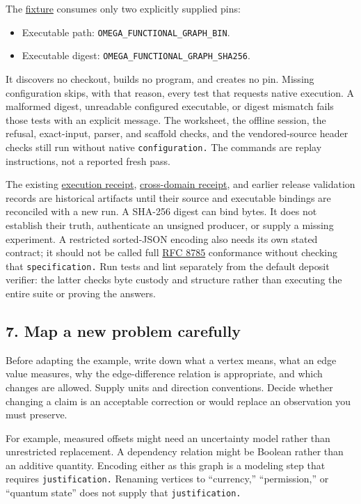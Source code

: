 \documentclass[
  11pt,
]{article}
\providecommand{\tightlist}{%
  \setlength{\itemsep}{0pt}\setlength{\parskip}{0pt}}
\begin{document}
The \href{code/tests/conftest.py}{fixture} consumes only two explicitly
supplied pins:

\begin{itemize}
\tightlist
\item
  Executable path: \nolinkurl{OMEGA_FUNCTIONAL_GRAPH_BIN}.
\item
  Executable digest: \nolinkurl{OMEGA_FUNCTIONAL_GRAPH_SHA256}.
\end{itemize}

It discovers no checkout, builds no program, and creates no pin. Missing
configuration skips, with that reason, every test that requests native
execution. A malformed digest, unreadable configured executable, or
digest mismatch fails those tests with an explicit message. The
worksheet, the offline session, the refusal, exact-input, parser, and
scaffold checks, and the vendored-source header checks still run without
native \nolinkurl{configuration.} The commands are replay instructions,
not a reported fresh pass.

The existing \href{code/paper_033_execution_receipt.json}{execution
receipt}, \href{code/cross_domain_symbol_game_receipt.json}{cross-domain
receipt}, and earlier release validation records are historical
artifacts until their source and executable bindings are reconciled with
a new run. A SHA-256 digest can bind bytes. It does not establish their
truth, authenticate an unsigned producer, or supply a missing
experiment. A restricted sorted-JSON encoding also needs its own stated
contract; it should not be called full
\href{https://www.rfc-editor.org/rfc/rfc8785}{RFC 8785} conformance
without checking that \nolinkurl{specification.} Run tests and lint
separately from the default deposit verifier: the latter checks byte
custody and structure rather than executing the entire suite or proving
the answers.

\subsection{7. Map a new problem
carefully}\label{map-a-new-problem-carefully}

Before adapting the example, write down what a vertex means, what an
edge value measures, why the edge-difference relation is appropriate,
and which changes are allowed. Supply units and direction conventions.
Decide whether changing a claim is an acceptable correction or would
replace an observation you must preserve.

For example, measured offsets might need an uncertainty model rather
than unrestricted replacement. A dependency relation might be Boolean
rather than an additive quantity. Encoding either as this graph is a
modeling step that requires \nolinkurl{justification.} Renaming vertices
to ``currency,'' ``permission,'' or ``quantum state'' does not supply
that \nolinkurl{justification.}
\end{document}
